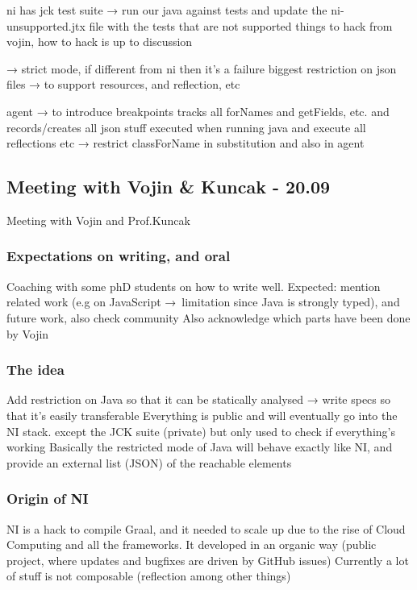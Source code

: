 ni has jck test suite → run our java against tests and update the ni-unsupported.jtx file with the tests that are not supported
things to hack from vojin, how to hack is up to discussion

→ strict mode, if different from ni then it’s a failure
biggest restriction on json files → to support resources, and reflection, etc 

agent → to introduce breakpoints tracks all forNames and getFields, etc. and records/creates all json stuff executed when running java and execute all reflections etc
→ restrict classForName in substitution and also in agent

\subsection{Meeting with Vojin \& Kuncak - 20.09}
Meeting with Vojin and Prof.Kuncak

\subsubsection{Expectations on writing, and oral}
Coaching with some phD students on how to write well.
Expected: mention related work (e.g on JavaScript → limitation since Java is strongly typed), and future work, also check community
Also acknowledge which parts have been done by Vojin

\subsubsection{The idea}
Add restriction on Java so that it can be statically analysed → write specs so that it’s easily transferable
Everything is public and will eventually go into the NI stack. except the JCK suite (private) but only used to check if everything’s working
Basically the restricted mode of Java will behave exactly like NI, and provide an external list (JSON) of the reachable elements

\subsubsection{Origin of NI}
NI is a hack to compile Graal, and it needed to scale up due to the rise of Cloud Computing and all the frameworks.
It developed in an organic way (public project, where updates and bugfixes are driven by GitHub issues)
Currently a lot of stuff is not composable (reflection among other things)


